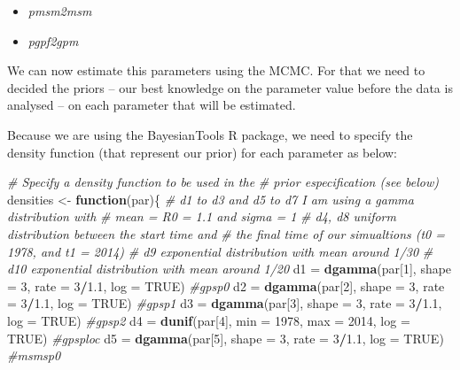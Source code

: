 \documentclass[12pt,]{article}
\newenvironment{Shaded}{\begin{snugshade}}{\end{snugshade}}
\newcommand{\CommentTok}[1]{\textcolor[rgb]{0.56,0.35,0.01}{\textit{#1}}}
\newcommand{\ControlFlowTok}[1]{\textcolor[rgb]{0.13,0.29,0.53}{\textbf{#1}}}
\newcommand{\DataTypeTok}[1]{\textcolor[rgb]{0.13,0.29,0.53}{#1}}
\newcommand{\DecValTok}[1]{\textcolor[rgb]{0.00,0.00,0.81}{#1}}
\newcommand{\FloatTok}[1]{\textcolor[rgb]{0.00,0.00,0.81}{#1}}
\newcommand{\KeywordTok}[1]{\textcolor[rgb]{0.13,0.29,0.53}{\textbf{#1}}}
\newcommand{\NormalTok}[1]{#1}
\newcommand{\OperatorTok}[1]{\textcolor[rgb]{0.81,0.36,0.00}{\textbf{#1}}}
\newcommand{\OtherTok}[1]{\textcolor[rgb]{0.56,0.35,0.01}{#1}}
\newcommand{\StringTok}[1]{\textcolor[rgb]{0.31,0.60,0.02}{#1}}
\providecommand{\tightlist}{%
  \setlength{\itemsep}{0pt}\setlength{\parskip}{0pt}}
\begin{document}
\begin{itemize}
\tightlist
\item
  \emph{pmsm2msm}
\item
  \emph{pgpf2gpm}
\end{itemize}

We can now estimate this parameters using the MCMC. For that we need to
decided the priors -- our best knowledge on the parameter value before
the data is analysed -- on each parameter that will be estimated.

Because we are using the BayesianTools R package, we need to specify the
density function (that represent our prior) for each parameter as below:

\begin{Shaded}
\begin{Highlighting}[]
\CommentTok{# Specify a density function to be used in the }
\CommentTok{# prior especification (see below)}
\NormalTok{densities <-}\StringTok{  }\ControlFlowTok{function}\NormalTok{(par)\{}
  \CommentTok{# d1 to d3 and d5 to d7 I am using a gamma distribution with }
  \CommentTok{#    mean = R0 = 1.1 and sigma = 1}
  \CommentTok{# d4, d8 uniform distribution between the start time and }
  \CommentTok{# the final time of our simualtions (t0 = 1978, and t1 = 2014)}
  \CommentTok{# d9 exponential distribution with mean around 1/30}
  \CommentTok{# d10 exponential distribution with mean around 1/20}
\NormalTok{  d1 =}\StringTok{ }\KeywordTok{dgamma}\NormalTok{(par[}\DecValTok{1}\NormalTok{], }\DataTypeTok{shape =} \DecValTok{3}\NormalTok{, }\DataTypeTok{rate =} \DecValTok{3}\OperatorTok{/}\FloatTok{1.1}\NormalTok{, }\DataTypeTok{log =} \OtherTok{TRUE}\NormalTok{) }\CommentTok{#gpsp0}
\NormalTok{  d2 =}\StringTok{ }\KeywordTok{dgamma}\NormalTok{(par[}\DecValTok{2}\NormalTok{], }\DataTypeTok{shape =} \DecValTok{3}\NormalTok{, }\DataTypeTok{rate =} \DecValTok{3}\OperatorTok{/}\FloatTok{1.1}\NormalTok{, }\DataTypeTok{log =} \OtherTok{TRUE}\NormalTok{) }\CommentTok{#gpsp1}
\NormalTok{  d3 =}\StringTok{ }\KeywordTok{dgamma}\NormalTok{(par[}\DecValTok{3}\NormalTok{], }\DataTypeTok{shape =} \DecValTok{3}\NormalTok{, }\DataTypeTok{rate =} \DecValTok{3}\OperatorTok{/}\FloatTok{1.1}\NormalTok{, }\DataTypeTok{log =} \OtherTok{TRUE}\NormalTok{) }\CommentTok{#gpsp2}
\NormalTok{  d4 =}\StringTok{ }\KeywordTok{dunif}\NormalTok{(par[}\DecValTok{4}\NormalTok{], }\DataTypeTok{min =} \DecValTok{1978}\NormalTok{, }\DataTypeTok{max =} \DecValTok{2014}\NormalTok{, }\DataTypeTok{log =} \OtherTok{TRUE}\NormalTok{) }\CommentTok{#gpsploc}
\NormalTok{  d5 =}\StringTok{ }\KeywordTok{dgamma}\NormalTok{(par[}\DecValTok{5}\NormalTok{], }\DataTypeTok{shape =} \DecValTok{3}\NormalTok{, }\DataTypeTok{rate =} \DecValTok{3}\OperatorTok{/}\FloatTok{1.1}\NormalTok{, }\DataTypeTok{log =} \OtherTok{TRUE}\NormalTok{) }\CommentTok{#msmsp0}

\end{Highlighting}
\end{Shaded}
\end{document}
